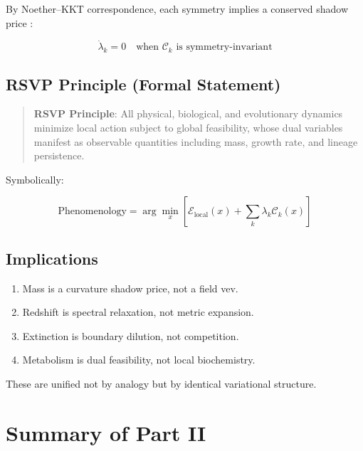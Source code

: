 \documentclass[11pt,a4paper]{article}
\begin{document}
By Noether–KKT correspondence, each symmetry implies a conserved shadow price \citep{Boyd2004}:

\begin{equation}
\dot{\lambda}_k = 0 \quad \text{when } \mathcal{C}_k \text{ is symmetry-invariant}
\end{equation}

\subsection{RSVP Principle (Formal Statement)}

\begin{quote}
\textbf{RSVP Principle}:  
All physical, biological, and evolutionary dynamics minimize local action subject to global feasibility, whose dual variables manifest as observable quantities including mass, growth rate, and lineage persistence.
\end{quote}

Symbolically:

\begin{equation}
\text{Phenomenology} = \arg\min_{x} \left[ \mathcal{E}_{\text{local}}(x) +
\sum_k \lambda_k \mathcal{C}_k(x) \right]
\end{equation}

\subsection{Implications}

\begin{enumerate}
    \item Mass is a curvature shadow price, not a field vev.
    \item Redshift is spectral relaxation, not metric expansion.
    \item Extinction is boundary dilution, not competition.
    \item Metabolism is dual feasibility, not local biochemistry.
\end{enumerate}

These are unified not by analogy but by identical variational structure.

\section{Summary of Part II}
\end{document}
